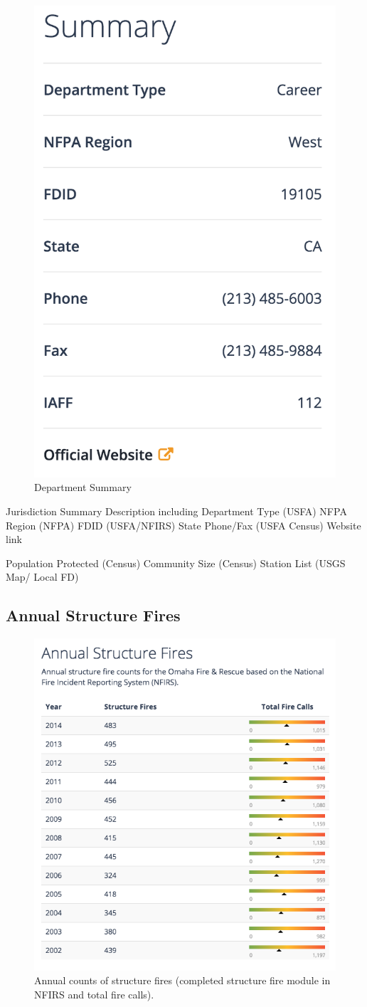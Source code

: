 \documentclass[12pt,oneside]{book}
\begin{document}
\begin{figure}[ht!]
\centering
\includegraphics[width=.5\columnwidth]{Figures/description2}
\caption{Department Summary}
\label{fig:description2}
\end{figure}

Jurisdiction Summary Description including 
Department Type (USFA)
NFPA Region (NFPA)
FDID (USFA/NFIRS)
State 
Phone/Fax (USFA Census)
Website link

Population Protected (Census)
Community Size (Census)
Station List (USGS Map/ Local FD)



\subsection{Annual Structure Fires}

\begin{figure}[ht!]
\centering
\includegraphics[width=.65\columnwidth]{Figures/structure_fires}
\caption{Annual counts of structure fires (completed structure fire module in NFIRS and total fire calls).}
\label{fig:structure_fires}
\end{figure}
\end{document}
